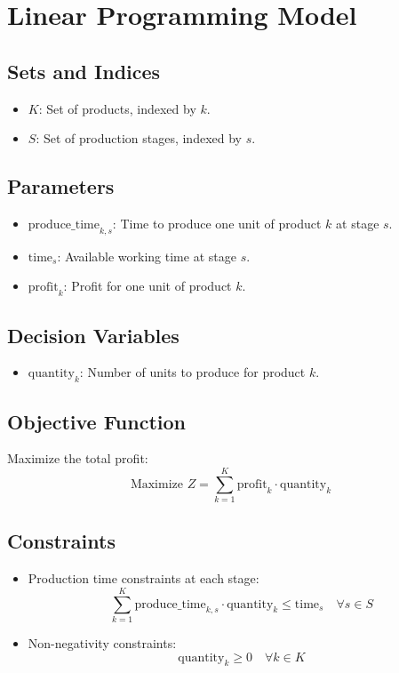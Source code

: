 \documentclass{article}
\begin{document}
\section*{Linear Programming Model}

\subsection*{Sets and Indices}
\begin{itemize}
    \item \( K \): Set of products, indexed by \( k \).
    \item \( S \): Set of production stages, indexed by \( s \).
\end{itemize}

\subsection*{Parameters}
\begin{itemize}
    \item \(\text{produce\_time}_{k,s}\): Time to produce one unit of product \( k \) at stage \( s \).
    \item \(\text{time}_{s}\): Available working time at stage \( s \).
    \item \(\text{profit}_{k}\): Profit for one unit of product \( k \).
\end{itemize}

\subsection*{Decision Variables}
\begin{itemize}
    \item \(\text{quantity}_{k}\): Number of units to produce for product \( k \).
\end{itemize}

\subsection*{Objective Function}
Maximize the total profit:
\[
\text{Maximize } Z = \sum_{k=1}^{K} \text{profit}_{k} \cdot \text{quantity}_{k}
\]

\subsection*{Constraints}
\begin{itemize}
    \item Production time constraints at each stage:
    \[
    \sum_{k=1}^{K} \text{produce\_time}_{k,s} \cdot \text{quantity}_{k} \leq \text{time}_{s} \quad \forall s \in S
    \]
    \item Non-negativity constraints:
    \[
    \text{quantity}_{k} \geq 0 \quad \forall k \in K
    \]
\end{itemize}
\end{document}

